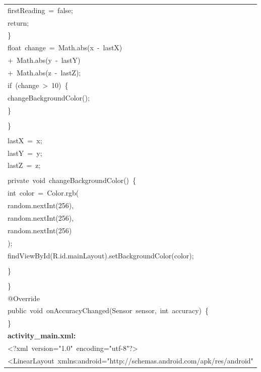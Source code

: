 \documentclass[a4paper,12pt]{article}
\begin{document}
\begin{longtable}{|p{}|}
{\ttfamily\small firstReading\ =\ false;} \\
{\ttfamily\small return;} \\
{\ttfamily\small \}} \\
{\ttfamily\small float\ change\ =\ Math.abs(x\ -\ lastX)} \\
{\ttfamily\small +\ Math.abs(y\ -\ lastY)} \\
{\ttfamily\small +\ Math.abs(z\ -\ lastZ);} \\
{\ttfamily\small if\ (change\ \textgreater{}\ 10)\ \{} \\
{\ttfamily\small changeBackgroundColor();} \\
{\ttfamily\small \}} \\
\strut \\
{\ttfamily\small \}} \\
\strut \\
{\ttfamily\small lastX\ =\ x;} \\
{\ttfamily\small lastY\ =\ y;} \\
{\ttfamily\small lastZ\ =\ z;} \\
\strut \\
{\ttfamily\small private\ void\ changeBackgroundColor()\ \{} \\
{\ttfamily\small int\ color\ =\ Color.rgb(} \\
{\ttfamily\small random.nextInt(256),} \\
{\ttfamily\small random.nextInt(256),} \\
{\ttfamily\small random.nextInt(256)} \\
{\ttfamily\small );} \\
{\ttfamily\small findViewById(R.id.mainLayout).setBackgroundColor(color);} \\
\strut \\
{\ttfamily\small \}} \\
\strut \\
{\ttfamily\small \}} \\
{\ttfamily\small @Override} \\
{\ttfamily\small public\ void\ onAccuracyChanged(Sensor\ sensor,\ int\ accuracy)\ \{} \\
{\ttfamily\small \}} \\
\hline
\rule{0pt}{13pt}\textbf{activity\_main.xml:} \\
\hline
{\ttfamily\small \textless{}?xml\ version="1.0"\ encoding="utf-8"?\textgreater{}} \\
{\ttfamily\small \textless{}LinearLayout\ xmlns:android="http://schemas.android.com/apk/res/android"} \\

\end{longtable}
\end{document}
